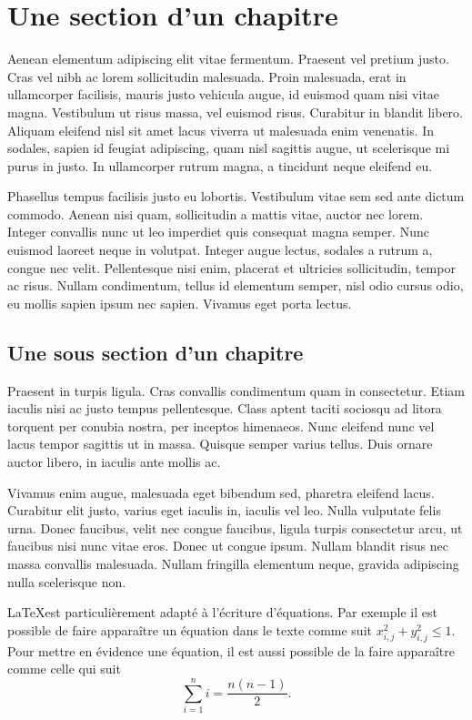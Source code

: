 \documentclass[a4paper,11pt]{scrbook}
\begin{document}
\section{Une section d'un chapitre}

Aenean elementum adipiscing elit vitae fermentum. Praesent vel pretium justo. Cras vel nibh ac lorem sollicitudin malesuada. Proin malesuada, erat in ullamcorper facilisis, mauris justo vehicula augue, id euismod quam nisi vitae magna. Vestibulum ut risus massa, vel euismod risus. Curabitur in blandit libero. Aliquam eleifend nisl sit amet lacus viverra ut malesuada enim venenatis. In sodales, sapien id feugiat adipiscing, quam nisl sagittis augue, ut scelerisque mi purus in justo. In ullamcorper rutrum magna, a tincidunt neque eleifend eu.

Phasellus tempus facilisis justo eu lobortis. Vestibulum vitae sem sed ante dictum commodo. Aenean nisi quam, sollicitudin a mattis vitae, auctor nec lorem. Integer convallis nunc ut leo imperdiet quis consequat magna semper. Nunc euismod laoreet neque in volutpat. Integer augue lectus, sodales a rutrum a, congue nec velit. Pellentesque nisi enim, placerat et ultricies sollicitudin, tempor ac risus. Nullam condimentum, tellus id elementum semper, nisl odio cursus odio, eu mollis sapien ipsum nec sapien. Vivamus eget porta lectus.


\subsection{Une sous section d'un chapitre}

Praesent in turpis ligula. Cras convallis condimentum quam in consectetur. Etiam iaculis nisi ac justo tempus pellentesque. Class aptent taciti sociosqu ad litora torquent per conubia nostra, per inceptos himenaeos. Nunc eleifend nunc vel lacus tempor sagittis ut in massa. Quisque semper varius tellus. Duis ornare auctor libero, in iaculis ante mollis ac.

Vivamus enim augue, malesuada eget bibendum sed, pharetra eleifend lacus. Curabitur elit justo, varius eget iaculis in, iaculis vel leo. Nulla vulputate felis urna. Donec faucibus, velit nec congue faucibus, ligula turpis consectetur arcu, ut faucibus nisi nunc vitae eros. Donec ut congue ipsum. Nullam blandit risus nec massa convallis malesuada. Nullam fringilla elementum neque, gravida adipiscing nulla scelerisque non.

\LaTeX est particulièrement adapté à l'écriture d'équations. Par exemple il est possible de faire apparaître un équation dans le texte comme suit $x_{i,j}^2 + y_{i,j}^2 \leq 1$. Pour mettre en évidence une équation, il est aussi possible de la faire apparaître comme celle qui suit
\begin{equation}
	\sum_{i=1}^{n} i = \frac{n(n-1)}{2}. \label{eq:euler_formule_somme}
\end{equation}
\end{document}

